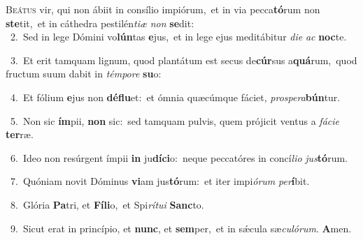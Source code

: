 \lettrine{\initial\textcolor{\initialcolor}{B}}{eátus} vir, qui non ábiit in consílio impiórum,~\dagger et in via pecca\-\textbf{tó}\-rum non \textbf{ste}\-tit,~\star et in cáthedra pestilén\-\textit{ti}\-\textit{æ} \textit{non} \textbf{se}\-dit:\\
{\numbfont\textcolor{\numbcolor}{~2.}}~Sed in lege Dómini vo\-\textbf{lún}\-tas \textbf{e}\-jus,~\star et in lege ejus meditábitur \textit{di}\-\textit{e} \textit{ac} \textbf{noc}\-te.\par
{\numbfont\textcolor{\numbcolor}{~3.}}~Et erit tamquam lignum, quod plantátum est secus de\-\textbf{cúr}\-sus a\-\textbf{quá}\-rum,~\star quod fructum suum dabit in \textit{tém}\-\textit{po}\textit{re} \textbf{su}\-o:\par
{\numbfont\textcolor{\numbcolor}{~4.}}~Et fólium \textbf{e}\-jus non \textbf{dé}\-\textbf{flu}et:~\star et ómnia quæcúmque fáciet, \textit{pro}\-\textit{spe}\textit{ra}\textbf{bún}tur.\par
{\numbfont\textcolor{\numbcolor}{~5.}}~Non sic \textbf{ím}\-pii, \textbf{non} sic:~\star sed tamquam pulvis, quem prójicit ventus a \textit{fá}\-\textit{ci}\textit{e} \textbf{ter}\-ræ.\par
{\numbfont\textcolor{\numbcolor}{~6.}}~Ideo non resúrgent ímpii \textbf{in} ju\-\textbf{dí}\-\textbf{ci}o:~\star neque peccatóres in concí\-\textit{li}\-\textit{o} \textit{jus}\-\textbf{tó}rum.\par
{\numbfont\textcolor{\numbcolor}{~7.}}~Quóniam novit Dóminus \textbf{vi}\-am jus\-\textbf{tó}\-rum:~\star et iter impi\-\textit{ó}\-\textit{rum} \textit{per}\-\textbf{í}bit.\par
{\numbfont\textcolor{\numbcolor}{~8.}}~Glória \textbf{Pa}\-tri, et \textbf{Fí}\-\textbf{li}o,~\star et Spi\-\textit{rí}\-\textit{tu}\textit{i} \textbf{Sanc}\-to.\par
{\numbfont\textcolor{\numbcolor}{~9.}}~Sicut erat in princípio, et \textbf{nunc}\-, et \textbf{sem}\-per,~\star et in sǽcula sæ\-\textit{cu}\-\textit{ló}\textit{rum}. \textbf{A}\-men.\par
